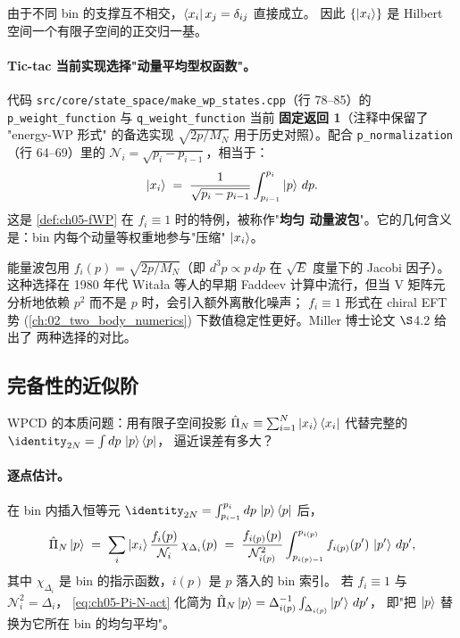 由于不同 bin 的支撑互不相交，\(\bra{x_i}{x_j} = \delta_{ij}\) 直接成立。
因此 \(\{\ket{x_{i}}\}\) 是 Hilbert 空间一个有限子空间的正交归一基。

\paragraph{Tic-tac 当前实现选择"动量平均型权函数"。}
代码 \texttt{src/core/state\_space/make\_wp\_states.cpp}（行 78--85）的
\texttt{p\_weight\_function} 与 \texttt{q\_weight\_function} 当前
\textbf{固定返回 1}（注释中保留了 "energy-WP 形式" 的备选实现
\(\sqrt{2p/M_N}\) 用于历史对照）。配合 \texttt{p\_normalization}
（行 64--69）里的 \(\mathcal{N}_i = \sqrt{p_i - p_{i-1}}\)，相当于：
\begin{equation}
\label{eq:ch05-fWP-uniform}
\ket{x_{i}}
\;=\;
\frac{1}{\sqrt{p_i - p_{i-1}}}
\int_{p_{i-1}}^{p_i} \ket{p}\,dp.
\end{equation}
这是 \cref{def:ch05-fWP} 在 \(f_i \equiv 1\) 时的特例，被称作"\textbf{均匀
动量波包}"。它的几何含义是：bin 内每个动量等权重地参与"压缩"
\(\ket{x_{i}}\)。

\begin{remark}
能量波包用 \(f_i(p) = \sqrt{2 p / M_N}\)（即 \(d^3p \propto p\,dp\)
在 \(\sqrt{E}\) 度量下的 Jacobi 因子）。这种选择在 1980 年代 Witała
等人的早期 Faddeev 计算中流行，但当 V 矩阵元分析地依赖 \(p^2\) 而不是
\(p\) 时，会引入额外离散化噪声；
\(f_i \equiv 1\) 形式在 chiral EFT 势 (\cref{ch:02_two_body_numerics})
下数值稳定性更好。Miller 博士论文 \(\S\)4.2 给出了
两种选择的对比。
\end{remark}

\subsection{完备性的近似阶}
\label{subsec:ch05-completeness}

WPCD 的本质问题：用有限子空间投影
\(\hat{\Pi}_N \equiv \sum_{i=1}^{N} \ket{x_{i}}\bra{x_i}\)
代替完整的 \(\identity_{2N} = \int dp\,\ket{p}\bra{p}\)，
逼近误差有多大？

\paragraph{逐点估计。}
在 bin 内插入恒等元
\(\identity_{2N} = \int_{p_{i-1}}^{p_i} dp\,\ket{p}\bra{p}\) 后，
\begin{equation}
\label{eq:ch05-Pi-N-act}
\hat{\Pi}_N \ket{p}
\;=\;
\sum_i \ket{x_{i}}
       \frac{f_i(p)}{\mathcal{N}_i}\,
       \chi_{\Delta_i}(p)
\;=\;
\frac{f_{i(p)}(p)}{\mathcal{N}_{i(p)}^2}
       \int_{p_{i(p)-1}}^{p_{i(p)}} f_{i(p)}(p')\,\ket{p'}\,dp',
\end{equation}
其中 \(\chi_{\Delta_i}\) 是 bin 的指示函数，\(i(p)\) 是 \(p\) 落入的 bin
索引。
若 \(f_i \equiv 1\) 与 \(\mathcal{N}_i^2 = \Delta_i\)，
\cref{eq:ch05-Pi-N-act} 化简为
\(\hat{\Pi}_N\ket{p} = \Delta_{i(p)}^{-1}
       \int_{\Delta_{i(p)}}\ket{p'}\,dp'\)，
即"把 \(\ket{p}\) 替换为它所在 bin 的均匀平均"。

